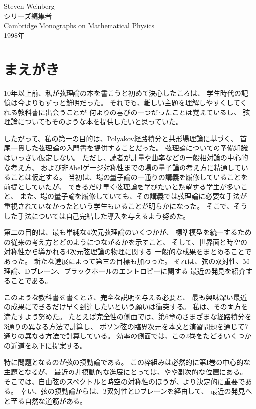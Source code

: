 \begin{flushright}
Steven Weinberg\\
シリーズ編集者\\
Cambridge Monographs on Mathematical Physics\\
1998年
\end{flushright}

\clearpage
\section*{まえがき}
10年以上前、私が弦理論の本を書こうと初めて決心したころは、
学生時代の記憶は今よりもずっと鮮明だった。
それでも、難しい主題を理解しやすくしてくれる教科書に出会うことが
何よりの喜びの一つだったことは覚えているし、
弦理論についてもそのような本を提供したいと思っていた。

したがって、私の第一の目的は、Polyakov経路積分と共形場理論に基づく、
首尾一貫した弦理論の入門書を提供することだった。
弦理論についての予備知識はいっさい仮定しない。
ただし、読者が計量や曲率などの一般相対論の中心的な考え方、
および非Abelゲージ対称性までの場の量子論の考え方に精通していることは仮定する。
当初は、場の量子論の一通りの講義を履修していることを前提としていたが、
できるだけ早く弦理論を学びたいと熱望する学生が多いこと、
また、場の量子論を履修していても、その講義では弦理論に必要な手法が
重視されていなかったという学生もいることが明らかになった。
そこで、そうした手法については自己完結した導入を与えるよう努めた。

第二の目的は、最も単純な4次元弦理論のいくつかが、
標準模型を統一するための従来の考え方とどのようにつながるかを示すこと、
そして、世界面と時空の対称性から導かれる4次元弦理論の物理に関する
一般的な成果をまとめることであった。
新たな進展によって第三の目標も加わった。
それは、弦の双対性、M理論、Dブレーン、ブラックホールのエントロピーに関する
最近の発見を紹介することである。

このような教科書を書くとき、完全な説明を与える必要と、
最も興味深い最近の成果にできるだけ早く到達したいという願いは衝突する。
私は、その両方を満たすよう努めた。
たとえば完全性の側面では、第6章のさまざまな経路積分を3通りの異なる方法で計算し、
ボソン弦の臨界次元を本文と演習問題を通じて7通りの異なる方法で計算している。
効率の側面では、この2巻をたどるいくつかの近道を以下に提案する。

特に問題となるのが弦の摂動論である。
この枠組みは必然的に第I巻の中心的な主題となるが、
最近の非摂動的な進展にとっては、やや副次的な位置にある。
そこでは、自由弦のスペクトルと時空の対称性のほうが、より決定的に重要である。
幸い、弦の摂動論からは、$T$双対性とDブレーンを経由して、
最近の発見へと至る自然な道筋がある。

